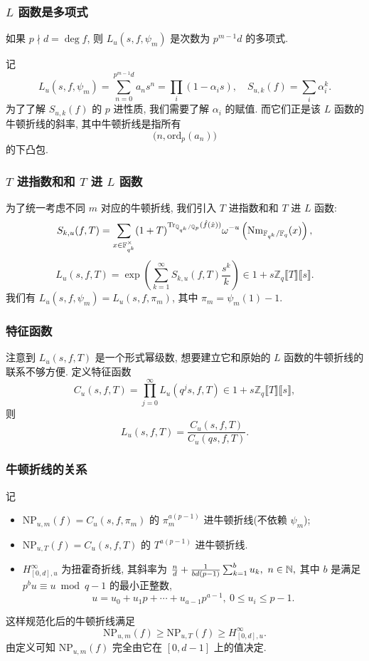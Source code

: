 \documentclass{beamer}
\newcommand\ldb{\llbracket}
\newcommand\rdb{\rrbracket}
\newcommand\BF{{\mathbb{F}}}  \newcommand\BG{{\mathbb{G}}}  \newcommand\BH{{\mathbb{H}}}  \newcommand\BI{{\mathbb{I}}}  \newcommand\BJ{{\mathbb{J}}}
\newcommand\BZ{{\mathbb{Z}}}
\newcommand\NP{{\mathrm{NP}}}
\newcommand\Nm{{\mathrm{Nm}}}
\newcommand\ord{{\mathrm{ord}}}
\newcommand\Tr{{\mathrm{Tr}}}
\begin{document}
\begin{frame}
\frametitle{$L$ 函数是多项式}
\begin{theorem}
如果 $p\nmid d=\deg f$, 则 $L_u(s,f,\psi_m)$ 是次数为 $p^{m-1}d$ 的多项式.
\end{theorem} 

记
	\[L_u(s,f,\psi_m)=\sum_{n=0}^{p^{m-1}d} a_n s^n=\prod_i(1-\alpha_i s),
	\quad S_{u,k}(f)=\sum_i \alpha_i^k.\]
为了了解 $S_{u,k}(f)$ 的 $p$ 进性质, 我们需要了解 $\alpha_i$ 的赋值.
而它们正是该 $L$ 函数的牛顿折线的斜率, 其中牛顿折线是指所有
	\[\bigl(n,\ord_p(a_n)\bigr)\]
的下凸包.
\end{frame}


\begin{frame}
\frametitle{$T$ 进指数和和 $T$ 进 $L$ 函数}
为了统一考虑不同 $m$ 对应的牛顿折线, 我们引入 $T$ 进指数和和 $T$ 进 $L$ 函数:
	\[	S_{k,u}(f,T)=\sum_{x\in\BF_{q^k}^\times}(1+T)^{\Tr_{\BQ_{q^k}/\BQ_p}(\hat f(\hat x))}\omega^{-u}\left(\Nm_{\BF_{q^k}/\BF_q}(x)\right), \]
	\[
		L_u(s,f,T)=\exp\left(\sum_{k=1}^\infty S_{k,u}(f,T)\frac{s^k}{k}\right)\in 1+s\BZ_q\ldb T\rdb\ldb s\rdb.
	\]
我们有 $L_u(s,f,\psi_m)=L_u(s,f,\pi_m)$, 其中 $\pi_m=\psi_m(1)-1$.
\end{frame}


\begin{frame}
\frametitle{特征函数}
注意到 $L_u(s,f,T)$ 是一个形式幂级数, 想要建立它和原始的 $L$ 函数的牛顿折线的联系不够方便.
定义特征函数
	\[C_u(s,f,T)=\prod_{j=0}^\infty L_u(q^j s,f,T)\in 1+s\BZ_q\ldb T\rdb\ldb s\rdb,\]
则
	\[	L_u(s,f,T)=\frac{C_u(s,f,T)}{C_u(qs,f,T)}.\]
\end{frame}


\begin{frame}
\frametitle{牛顿折线的关系}
记
\begin{itemize}
\item $\NP_{u,m}(f)=C_u(s,f,\pi_m)$ 的 $\pi_m^{a(p-1)}$ 进牛顿折线(不依赖 $\psi_m$);
\item $\NP_{u,T}(f)=C_u(s,f,T)$ 的 $T^{a(p-1)}$ 进牛顿折线.
\item $H_{[0,d],u}^\infty$ 为扭霍奇折线, 其斜率为 $\tfrac{n}{d}+\tfrac{1}{bd(p-1)}\sum_{k=1}^b u_k,\ n\in\BN,$
其中 $b$ 是满足 $p^bu\equiv u\bmod{q-1}$ 的最小正整数,
	\[u=u_0+u_1p+\cdots+u_{a-1}p^{a-1},\ 0\le u_i\le p-1.\]
\end{itemize}
这样规范化后的牛顿折线满足
	\[\NP_{u,m}(f)\ge \NP_{u,T}(f)\ge H_{[0,d],u}^\infty.\]
由定义可知 $\NP_{u,m}(f)$ 完全由它在 $[0,d-1]$ 上的值决定.
\end{frame}
\end{document}
